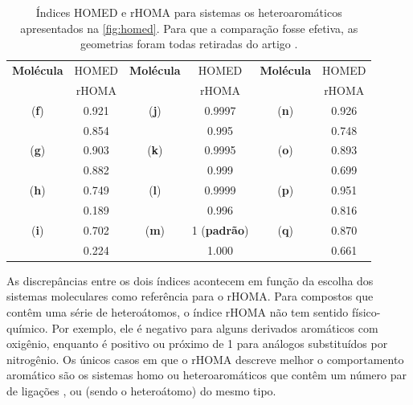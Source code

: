 \begin{table}[htb]
	\centering
	\caption{\label{tab:homed/homa} Índices \gls{HOMED} e \gls{rHOMA} para sistemas os heteroaromáticos apresentados na \autoref{fig:homed}. Para que a comparação fosse efetiva, as geometrias foram todas retiradas do artigo \cite{giov2020}.}
	\begin{tabular}{cccccc}
		\toprule
	\textbf{Molécula} & \gls{HOMED} & \textbf{Molécula} & \gls{HOMED} & \textbf{Molécula} & \gls{HOMED}
 \\
  & \gls{rHOMA} & & \gls{rHOMA} & & \gls{rHOMA}
 \\
		\midrule
    (\textbf{f}) & 0.921 & (\textbf{j}) & 0.9997 & (\textbf{n}) & 0.926 \\
    & 0.854 & & 0.995 & & 0.748 \\
    (\textbf{g}) & 0.903 & (\textbf{k}) & 0.9995  & (\textbf{o}) & 0.893 \\
    & 0.882 & & 0.999 & &  0.699 \\
    (\textbf{h}) & 0.749  & (\textbf{l}) & 0.9999 & (\textbf{p}) & 0.951 \\
    & 0.189 & & 0.996 & & 0.816 \\
    (\textbf{i}) & 0.702 & (\textbf{m}) & 1 (\textbf{padrão}) & (\textbf{q}) & 0.870  \\
    & 0.224 & & 1.000 & & 0.661 \\
    \bottomrule
	\end{tabular}
\end{table}

As discrepâncias entre os dois índices acontecem em função da escolha dos sistemas moleculares como referência para o \gls{rHOMA}. Para compostos que contêm uma série de heteroátomos, o índice \gls{rHOMA} não tem sentido físico-químico. Por exemplo, ele é negativo para alguns derivados aromáticos com oxigênio, enquanto é positivo ou próximo de 1 para análogos substituídos por nitrogênio. Os únicos casos em que o \gls{rHOMA} descreve melhor o comportamento aromático são os sistemas homo ou heteroaromáticos que contêm um número par de ligações ,  ou  (sendo  o heteroátomo) do mesmo tipo.

